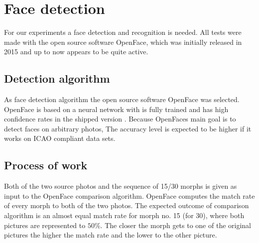 \section{Face detection}
\label{detection}
For our experiments a face detection and recognition is needed. All tests were made with the open source software OpenFace, which was initially released in 2015 and up to now appears to be quite active\cite{amos2016openface}.

\subsection{Detection algorithm} %
As face detection algorithm the open source software OpenFace was selected. OpenFace is based on a neural network with is fully trained and has high confidence rates in the shipped version \cite{baltruvsaitis2016openface}. Because OpenFaces main goal is to detect faces on arbitrary photos, The accuracy level is expected to be higher if it works on ICAO compliant data sets. 


\subsection{Process of work}
Both of the two source photos and the sequence of 15/30 morphs is given as input to the OpenFace comparison algorithm. OpenFace computes the match rate of every morph to both of the two photos. 
The expected outcome of comparison algorithm is an almost equal match rate for morph no. 15 (for 30), where both pictures are represented to $50\%$. The closer the morph gets to one of the original pictures the higher the match rate and the lower to the other picture. 

